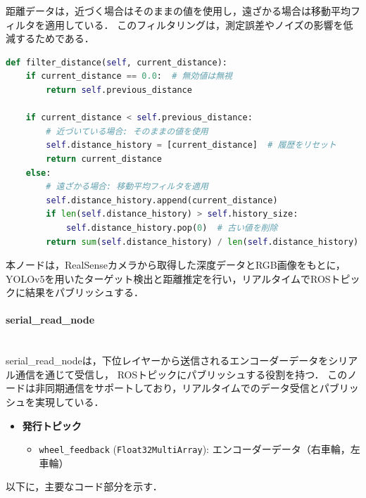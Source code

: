距離データは，近づく場合はそのままの値を使用し，遠ざかる場合は移動平均フィルタを適用している．
このフィルタリングは，測定誤差やノイズの影響を低減するためである．

\begin{lstlisting}[language=Python, caption=距離データのフィルタリング (RealSense\_node.py)]
def filter_distance(self, current_distance):
    if current_distance == 0.0:  # 無効値は無視
        return self.previous_distance

    if current_distance < self.previous_distance:
        # 近づいている場合: そのままの値を使用
        self.distance_history = [current_distance]  # 履歴をリセット
        return current_distance
    else:
        # 遠ざかる場合: 移動平均フィルタを適用
        self.distance_history.append(current_distance)
        if len(self.distance_history) > self.history_size:
            self.distance_history.pop(0)  # 古い値を削除
        return sum(self.distance_history) / len(self.distance_history)
\end{lstlisting}

本ノードは，RealSenseカメラから取得した深度データとRGB画像をもとに，
YOLOv5を用いたターゲット検出と距離推定を行い，リアルタイムでROSトピックに結果をパブリッシュする．

\paragraph{serial\_read\_node}\mbox{}\\
serial\_read\_nodeは，下位レイヤーから送信されるエンコーダーデータをシリアル通信を通じて受信し，
ROSトピックにパブリッシュする役割を持つ．
このノードは非同期通信をサポートしており，リアルタイムでのデータ受信とパブリッシュを実現している．

\begin{itemize}
    \item \textbf{発行トピック}
          \begin{itemize}
              \item \texttt{wheel\_feedback} (\texttt{Float32MultiArray}): エンコーダーデータ（右車輪，左車輪）
          \end{itemize}
\end{itemize}

以下に，主要なコード部分を示す．


